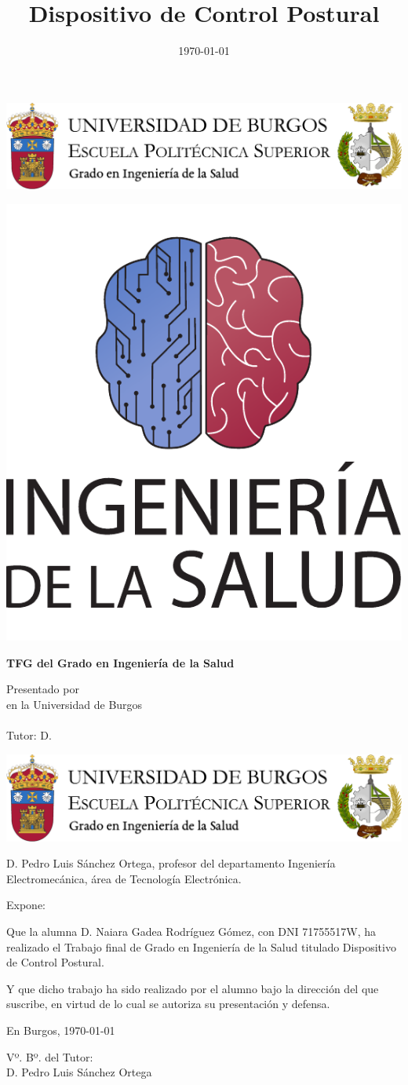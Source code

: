 \documentclass[a4paper,12pt,twoside]{memoir}
\title{Dispositivo de Control Postural}
\author{\nombre}
\date{\today}
\makeatletter
\def\maketitle{
  \null
  \thispagestyle{empty}
\begin{center}
  \noindent\includegraphics[width=\textwidth]{cabeceraSalud}\vspace{1.5cm}%
\end{center}
  
  \begin{center}
    \begin{minipage}[c][1.5cm][c]{.20\textwidth}
        \includegraphics[width=\textwidth]{escudoSalud.pdf}
    \end{minipage}
  \end{center}
  
  \begin{center}
    \colorbox{cpardoBox}{%
        \begin{minipage}{.8\textwidth}
          \vspace{.5cm}\Large
          \begin{center}
          \textbf{TFG del Grado en Ingeniería de la Salud}\vspace{.6cm}\\
          \textbf{\LARGE\@title{}}
          \end{center}
          \vspace{.2cm}
        \end{minipage}
    }%
  \end{center}
  
  \begin{center}%
  {%
    \noindent\LARGE
    Presentado por \@author{}\\ 
    en la Universidad de Burgos\\
    \vspace{0.5cm}
    \noindent\Large
    \@date{}\\
    \vspace{0.5cm}
    Tutor: D. \@tutor{}\\ %
  }%
  \end{center}%
  \null
  \cleardoublepage
  }
\newcommand{\nombre}{Naiara Gadea Rodríguez Gómez}
\newcommand{\nombreTutor}{Pedro Luis Sánchez Ortega}
\newcommand{\nombreTutorb}{Tutor 2}
\newcommand{\dni}{71755517W}
\makeatother
\begin{document}
\maketitle


\newpage\null\thispagestyle{empty}\newpage

\thispagestyle{empty}


\noindent\includegraphics[width=\textwidth]{cabeceraSalud}\vspace{1cm}

\noindent D. \nombreTutor, profesor del departamento Ingeniería Electromecánica, área de Tecnología Electrónica.

\noindent Expone:

\noindent Que la alumna D. \nombre, con DNI \dni, ha realizado el Trabajo final de Grado en Ingeniería de la Salud titulado Dispositivo de Control Postural. 

\noindent Y que dicho trabajo ha sido realizado por el alumno bajo la dirección del que suscribe, en virtud de lo cual se autoriza su presentación y defensa.

\begin{center} %
En Burgos, {\large \today}
\end{center}

\vfill\vfill\vfill

\begin{minipage}{0.45\textwidth}
\begin{flushleft} %
Vº. Bº. del Tutor:\\[2cm]
D. \nombreTutor
\end{flushleft}
\end{minipage}
\hfill
\hfill

\vfill

\end{document}
